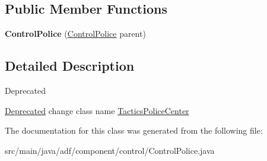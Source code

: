\subsection*{Public Member Functions}
\begin{DoxyCompactItemize}
\item 
\hypertarget{classadf_1_1component_1_1control_1_1ControlPolice_a5f749280b92a7b6785bf6207f91834f8}{}\label{classadf_1_1component_1_1control_1_1ControlPolice_a5f749280b92a7b6785bf6207f91834f8} 
{\bfseries Control\+Police} (\hyperlink{classadf_1_1component_1_1control_1_1ControlPolice}{Control\+Police} parent)
\end{DoxyCompactItemize}


\subsection{Detailed Description}
\begin{DoxyRefDesc}{Deprecated}
\item[\hyperlink{deprecated__deprecated000012}{Deprecated}]change class name \hyperlink{}{Tactics\+Police\+Center} \end{DoxyRefDesc}


The documentation for this class was generated from the following file\+:\begin{DoxyCompactItemize}
\item 
src/main/java/adf/component/control/Control\+Police.\+java\end{DoxyCompactItemize}
